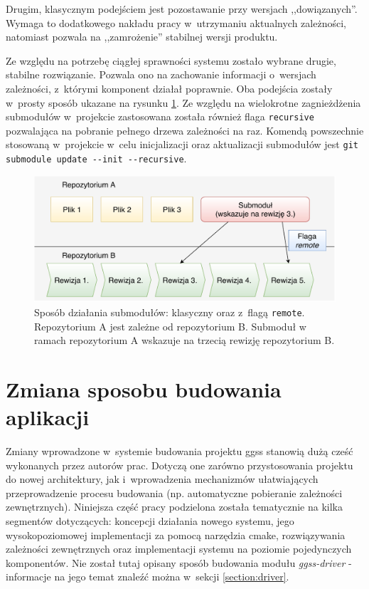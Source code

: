 Drugim, klasycznym podejściem jest pozostawanie przy wersjach ,,dowiązanych''. Wymaga to dodatkowego nakładu pracy w~utrzymaniu aktualnych zależności, natomiast pozwala na ,,zamrożenie'' stabilnej wersji produktu.

Ze względu na potrzebę ciągłej sprawności systemu zostało wybrane drugie, stabilne rozwiązanie. Pozwala ono na zachowanie informacji o~wersjach zależności, z~którymi komponent działał poprawnie. Oba podejścia zostały w~prosty sposób ukazane na rysunku \ref{fig:subRem}. Ze względu na wielokrotne zagnieżdżenia submodułów w~projekcie zastosowana została również flaga \lstinline{recursive} pozwalająca na pobranie pełnego drzewa zależności na raz. Komendą powszechnie stosowaną w~projekcie w~celu inicjalizacji oraz aktualizacji submodułów jest \lstinline{git submodule update --init --recursive}.

\begin{figure}[H]
\centering
\includegraphics[width=\textwidth]{res/submoduleRemote}
\caption{Sposób działania submodułów: klasyczny oraz z~flagą \lstinline{remote}. Repozytorium A jest zależne od repozytorium B. Submoduł w ramach repozytorium A wskazuje na trzecią rewizję repozytorium B.}
\label{fig:subRem}
\end{figure}



\newpage

\section{Zmiana sposobu budowania aplikacji}
Zmiany wprowadzone w~systemie budowania projektu \gls*{ggss} stanowią dużą cześć wykonanych przez autorów prac. Dotyczą one zarówno przystosowania projektu do nowej architektury, jak i~wprowadzenia mechanizmów ułatwiających przeprowadzenie procesu budowania (np. automatyczne pobieranie zależności zewnętrznych). Niniejsza część pracy podzielona została tematycznie na kilka segmentów dotyczących: koncepcji działania nowego systemu, jego wysokopoziomowej implementacji za pomocą narzędzia \gls*{cmake}, rozwiązywania zależności zewnętrznych oraz implementacji systemu na poziomie pojedynczych komponentów. Nie został tutaj opisany sposób budowania modułu \textit{ggss-driver} - informacje na jego temat znaleźć można w~sekcji \ref{section:driver}.

